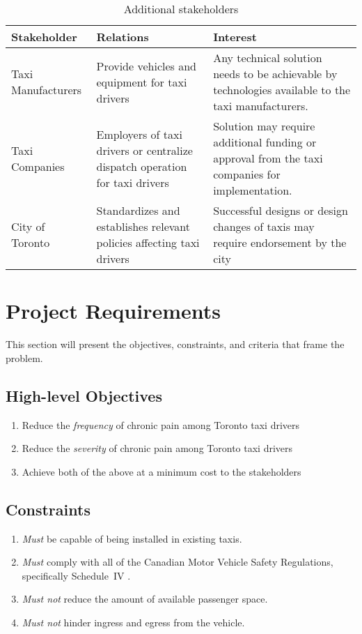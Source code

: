 \documentclass[11pt]{article}
\begin{document}
\begin{table}[h]
  \centering
  \caption{Additional stakeholders}
    \begin{tabular}{ l p{5cm} p{5cm}}
    Stakeholder & Relations &	Interest \\ \hline
    Taxi Manufacturers & Provide vehicles and equipment for taxi drivers	& 
    Any technical solution needs to be achievable by technologies available 
    to the taxi manufacturers. \\ 
    Taxi Companies & Employers of taxi drivers or centralize dispatch 
    operation for taxi drivers	& Solution may require additional funding 
    or approval from the taxi companies for implementation. \\
    City of Toronto & Standardizes and establishes relevant policies 
    affecting taxi drivers \cite{CityofToronto}	& Successful designs or design changes of  
    taxis may require endorsement by the city  \\
    \end{tabular}
\end{table}
\clearpage
\section{Project Requirements}
\label{sec:requirements}
This section will present the objectives, constraints, and criteria 
that frame the problem.

\subsection{High-level Objectives}
\label{sec:high-level-objectives}

\begin{enumerate}
\item Reduce the \emph{frequency} of chronic pain among Toronto taxi drivers
\item Reduce the \emph{severity} of chronic pain among Toronto taxi drivers
\item Achieve both of the above at a minimum cost to the stakeholders
\end{enumerate}

\subsection{Constraints}
\begin{enumerate}
\item \emph{Must} be capable of being installed in existing taxis.
\item \emph{Must} comply with all of the Canadian Motor Vehicle Safety Regulations,
specifically Schedule~IV \cite{motorregs}.
\item \emph{Must not} reduce the amount of available passenger space.
\item \emph{Must not} hinder ingress and egress from the vehicle.
\end{enumerate}
\end{document}

